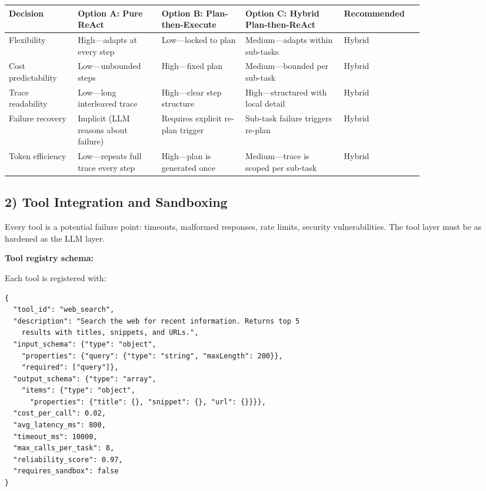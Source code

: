 \begin{tabular}{|p{0.14\linewidth}|p{0.17\linewidth}|p{0.17\linewidth}|p{0.20\linewidth}|p{0.14\linewidth}|}
\hline
\textbf{Decision} & \textbf{Option A: Pure ReAct} & \textbf{Option B: Plan-then-Execute} & \textbf{Option C: Hybrid Plan-then-ReAct} & \textbf{Recommended} \\
\hline
Flexibility & High---adapts at every step & Low---locked to plan & Medium---adapts within sub-tasks & Hybrid \\
\hline
Cost predictability & Low---unbounded steps & High---fixed plan & Medium---bounded per sub-task & Hybrid \\
\hline
Trace readability & Low---long interleaved trace & High---clear step structure & High---structured with local detail & Hybrid \\
\hline
Failure recovery & Implicit (LLM reasons about failure) & Requires explicit re-plan trigger & Sub-task failure triggers re-plan & Hybrid \\
\hline
Token efficiency & Low---repeats full trace every step & High---plan is generated once & Medium---trace is scoped per sub-task & Hybrid \\
\hline
\end{tabular}

\subsection*{2) Tool Integration and Sandboxing}

Every tool is a potential failure point: timeouts, malformed responses, rate limits, security vulnerabilities. The tool layer must be as hardened as the LLM layer.

\textbf{Tool registry schema:}

Each tool is registered with:

\begin{verbatim}
{
  "tool_id": "web_search",
  "description": "Search the web for recent information. Returns top 5
    results with titles, snippets, and URLs.",
  "input_schema": {"type": "object",
    "properties": {"query": {"type": "string", "maxLength": 200}},
    "required": ["query"]},
  "output_schema": {"type": "array",
    "items": {"type": "object",
      "properties": {"title": {}, "snippet": {}, "url": {}}}},
  "cost_per_call": 0.02,
  "avg_latency_ms": 800,
  "timeout_ms": 10000,
  "max_calls_per_task": 8,
  "reliability_score": 0.97,
  "requires_sandbox": false
}
\end{verbatim}

